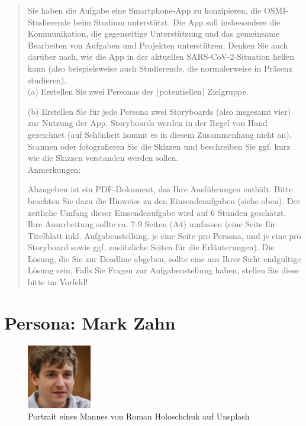 \documentclass{article}
\begin{document}
\begin{quote}
	Sie haben die Aufgabe eine Smartphone-App zu konzipieren, die OSMI-Studierende beim Studium unterstützt.
	Die App soll insbesondere die Kommunikation, die gegenseitige Unterstützung und das gemeinsame Bearbeiten
	von Aufgaben und Projekten unterstützen. Denken Sie auch darüber nach, wie die App in der aktuellen
	SARS-CoV-2-Situation helfen kann (also beispielsweise auch Studierende, die normalerweise in Präsenz studieren).
	\\[1em]
	(a) Erstellen Sie zwei Personas der (potentiellen) Zielgruppe.

	(b) Erstellen Sie für jede Persona zwei Storyboards (also insgesamt vier) zur Nutzung der App. Storyboards
	werden in der Regel von Hand gezeichnet (auf Schönheit kommt es in diesem Zusammenhang nicht an). Scannen
	oder fotografieren Sie die Skizzen und beschreiben Sie ggf. kurz wie die Skizzen verstanden werden sollen.
	\\[1em]
	Anmerkungen:

	Abzugeben ist ein PDF-Dokument, das Ihre Ausführungen enthält. Bitte beachten Sie dazu die Hinweise zu den
	Einsendeaufgaben (siehe oben). Der zeitliche Umfang dieser Einsendeaufgabe wird auf 6 Stunden geschätzt.
	Ihre Ausarbeitung sollte ca. 7-9 Seiten (A4) umfassen (eine Seite für Titelblatt inkl. Aufgabenstellung,
	je eine Seite pro Persona, und je eine pro Storyboard sowie ggf. zusätzliche Seiten für die Erläuterungen).
	Die Lösung, die Sie zur Deadline abgeben, sollte eine aus Ihrer Sicht endgültige Lösung sein. Falls Sie
	Fragen zur Aufgabenstellung haben, stellen Sie diese bitte im Vorfeld!
\end{quote}

\newpage

\section{Persona: Mark Zahn}

\begin{figure}[h]
	\includegraphics[width=0.25\textwidth]{mark}
	\centering
	\caption{Portrait eines Mannes von Roman Holoschchuk auf Unsplash}
\end{figure}
\end{document}
